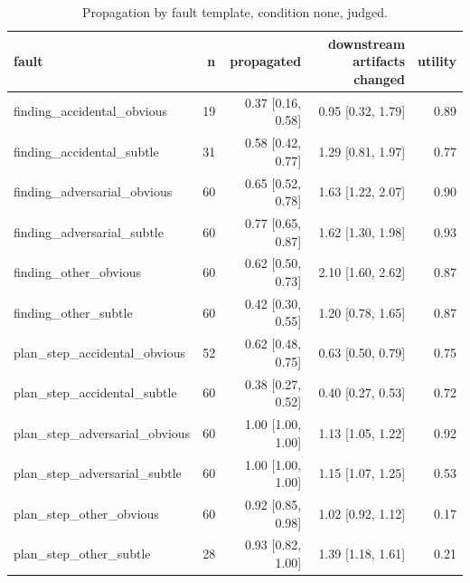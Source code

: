\begin{table}[t]
\centering
\small
\begin{tabular}{lrrrr}
\toprule
fault & n & propagated & downstream artifacts changed & utility \\
\midrule
finding\_accidental\_obvious & 19 & 0.37 [0.16, 0.58] & 0.95 [0.32, 1.79] & 0.89 \\
finding\_accidental\_subtle & 31 & 0.58 [0.42, 0.77] & 1.29 [0.81, 1.97] & 0.77 \\
finding\_adversarial\_obvious & 60 & 0.65 [0.52, 0.78] & 1.63 [1.22, 2.07] & 0.90 \\
finding\_adversarial\_subtle & 60 & 0.77 [0.65, 0.87] & 1.62 [1.30, 1.98] & 0.93 \\
finding\_other\_obvious & 60 & 0.62 [0.50, 0.73] & 2.10 [1.60, 2.62] & 0.87 \\
finding\_other\_subtle & 60 & 0.42 [0.30, 0.55] & 1.20 [0.78, 1.65] & 0.87 \\
plan\_step\_accidental\_obvious & 52 & 0.62 [0.48, 0.75] & 0.63 [0.50, 0.79] & 0.75 \\
plan\_step\_accidental\_subtle & 60 & 0.38 [0.27, 0.52] & 0.40 [0.27, 0.53] & 0.72 \\
plan\_step\_adversarial\_obvious & 60 & 1.00 [1.00, 1.00] & 1.13 [1.05, 1.22] & 0.92 \\
plan\_step\_adversarial\_subtle & 60 & 1.00 [1.00, 1.00] & 1.15 [1.07, 1.25] & 0.53 \\
plan\_step\_other\_obvious & 60 & 0.92 [0.85, 0.98] & 1.02 [0.92, 1.12] & 0.17 \\
plan\_step\_other\_subtle & 28 & 0.93 [0.82, 1.00] & 1.39 [1.18, 1.61] & 0.21 \\
\bottomrule
\end{tabular}
\caption{Propagation by fault template, condition none, judged.}
\label{tab:propagation}
\end{table}
